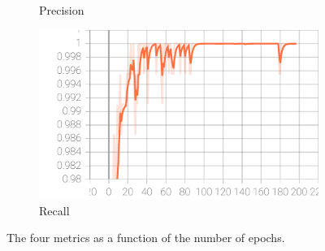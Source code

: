 \documentclass[10pt,conference,compsocconf]{IEEEtran}
\begin{document}
\begin{appendices}
\begin{figure}[!ht]
\begin{subfigure}{0.24\textwidth}
    \caption{Precision}
  \end{subfigure}
  \hfil
  \begin{subfigure}{0.24\textwidth}
    \includegraphics[width=\linewidth]{Image/metrics_recall.pdf}
    \caption{Recall}
  \end{subfigure}
  \caption{The four metrics as a function of the number of epochs.}
\end{figure}


\end{appendices}
\end{document}
